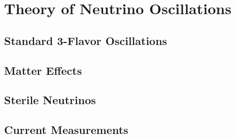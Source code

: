 \chapter{Theory of Neutrino Oscillations}

\section{Standard 3-Flavor Oscillations}

\section{Matter Effects}

\section{Sterile Neutrinos}

\section{Current Measurements}
